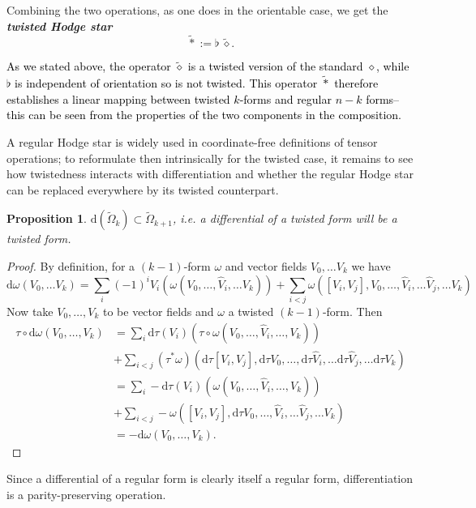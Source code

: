 \documentclass[11pt,twoside]{article}
\newtheorem{prop}[theorem]{Proposition}
\theoremstyle{definition}
\numberwithin{equation}{section}
\begin{document}
 Combining the two operations, as one does in the orientable case, we get the \textit{\textbf{twisted Hodge star}}
 \[
 \widetilde{\ast}:=\flat\ \widetilde{\diamond}.\]

 \textcolor{black}{As we stated above, the operator  $\widetilde{\diamond}$ is a twisted version of the standard $\diamond$, while $\flat$ is independent of orientation so is not twisted.
 This operator $\widetilde{\ast}$ therefore  establishes a linear mapping between twisted $k$-forms and regular $n-k$ forms-- this can be seen from the properties of the two components in the composition. }

 A regular Hodge star is widely used in coordinate-free definitions of tensor operations; to reformulate then intrinsically for the  twisted case, it remains to see how twistedness interacts with differentiation and whether the regular Hodge star can be replaced everywhere by its twisted counterpart.
\begin{prop}
\label{st: d preserves twistedness}$\mathrm{d}\left(\widetilde{\Omega}_k\right)\subset\widetilde{\Omega}_{k+1}$, i.e. a differential of a twisted form will be a twisted form. 
\end{prop}

\begin{proof}
By definition, for a $(k-1)$-form $\omega$ and vector fields $V_0,\ldots V_k$ we have
\[
\mathrm{d}\omega\left(V_0,\ldots V_k\right) = \sum\limits_i(-1)^iV_i\left(\omega\left(V_0,\ldots ,\hat{V}_i,\ldots V_k\right)\right) + \sum\limits_{i<j}\omega\left([V_i,V_j],V_0,\ldots ,\hat{V}_i,\ldots \hat{V}_j,\ldots V_k\right)
\]
Now take $V_0, \ldots,V_k$ to be vector fields and $\omega$ a twisted $(k-1)$-form. Then 
\begin{equation*}
    \begin{split}
       \tau\circ \mathrm{d}\omega(V_0,\ldots,V_k)  &= \sum\limits_i \mathrm{d}\tau(V_i)\left(\tau\circ \omega(V_0,\ldots,\hat{V}_i,\ldots, V_k)\right)\\ &+ \sum\limits_{i<j}(\tau^{\ast}\omega)\left(\mathrm{d}\tau[V_i,V_j],\mathrm{d}\tau V_0,\ldots ,\mathrm{d}\tau \hat{V}_i,\ldots \mathrm{d}\tau\hat{V}_j,\ldots \mathrm{d}\tau V_k\right)\\&=\sum\limits_i -\mathrm{d}\tau(V_i)\left( \omega(V_0,\ldots,\hat{V}_i,\ldots, V_k)\right)\\ &+ \sum\limits_{i<j}-\omega\left([V_i,V_j],\mathrm{d}\tau V_0,\ldots , \hat{V}_i,\ldots \hat{V}_j,\ldots 
       V_k\right)\\&
       =-\mathrm{d}\omega(V_0,\ldots,V_k).
    \end{split}
\end{equation*}
\end{proof}
Since a differential of a regular form is clearly itself a regular form, differentiation is a parity-preserving operation. 
\end{document}
